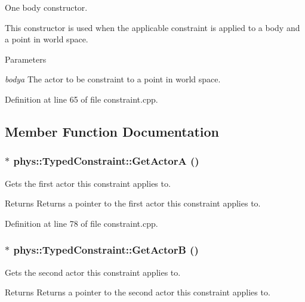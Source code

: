 One body constructor. 

This constructor is used when the applicable constraint is applied to a body and a point in world space. 
\begin{DoxyParams}{Parameters}
\item[{\em bodya}]The actor to be constraint to a point in world space. \end{DoxyParams}


Definition at line 65 of file constraint.cpp.



\subsection{Member Function Documentation}
\hypertarget{classphys_1_1TypedConstraint_aae01815d877566ae4e100bb481ed2f5e}{
\subsubsection[{GetActorA}]{ $\ast$ phys::TypedConstraint::GetActorA ()}}
\label{d1/d17/classphys_1_1TypedConstraint_aae01815d877566ae4e100bb481ed2f5e}


Gets the first actor this constraint applies to. 

\begin{DoxyReturn}{Returns}
Returns a pointer to the first actor this constraint applies to. 
\end{DoxyReturn}


Definition at line 78 of file constraint.cpp.

\hypertarget{classphys_1_1TypedConstraint_a5d988a4d724ed77ca846417d466e9e1a}{
\subsubsection[{GetActorB}]{ $\ast$ phys::TypedConstraint::GetActorB ()}}
\label{d1/d17/classphys_1_1TypedConstraint_a5d988a4d724ed77ca846417d466e9e1a}


Gets the second actor this constraint applies to. 

\begin{DoxyReturn}{Returns}
Returns a pointer to the second actor this constraint applies to. 
\end{DoxyReturn}


